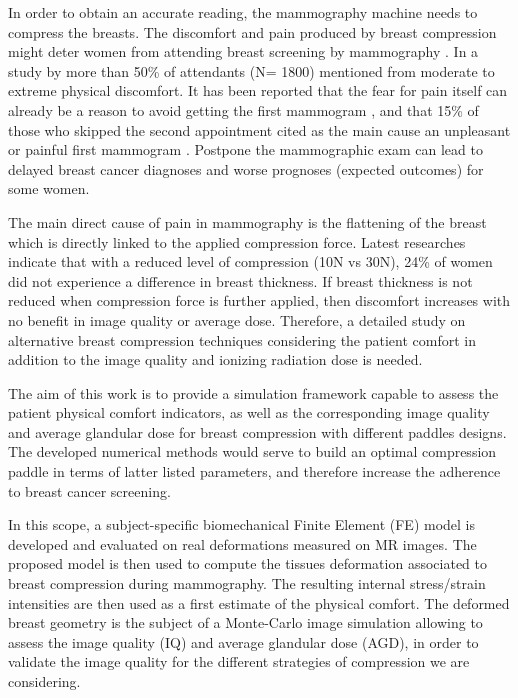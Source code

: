 In order to obtain an accurate reading, the mammography machine needs to compress the breasts.  The discomfort and pain produced by breast compression might deter women from attending breast screening by mammography  \citep{aro_psychosocial_1999,fleming_intermittent_2013}. In a study by \citep{dullum_rates_2000} more than 50\% of attendants (N= 1800) mentioned from moderate to extreme physical discomfort.  It has been reported that the
fear for pain itself can already be a reason to avoid getting the first mammogram \citep{andrews_pain_2001}, and that 15\% of those who skipped the second appointment cited as the main cause an unpleasant or painful first mammogram \citep{fleming_intermittent_2013,whelehan_effect_2013}.  Postpone the mammographic exam can lead to delayed breast cancer diagnoses and worse prognoses (expected outcomes) for some women.

The main direct cause of pain in mammography is the flattening of the breast which is directly linked to the applied compression force. Latest researches indicate that with a reduced level of compression (10N vs 30N), 24\% of women did not experience a difference in breast thickness. If breast thickness is not reduced when compression force is further applied, then discomfort increases with no benefit in image quality or average dose. Therefore, a detailed study on alternative breast compression techniques considering the patient comfort in addition to the image quality and ionizing radiation dose is needed.

The aim of this work is to provide a simulation framework capable to assess the patient physical comfort indicators, as well as the corresponding image quality and average glandular dose for breast compression with different paddles designs. The developed numerical methods would serve to build an optimal compression paddle in terms of latter listed parameters, and therefore increase the adherence to breast cancer screening. 

In this scope, a subject-specific biomechanical Finite Element (FE) model is developed and evaluated on real deformations measured on MR images. The proposed model is then used to compute the tissues deformation associated to breast compression during mammography.  The resulting internal stress/strain intensities are then used as a first estimate of the physical comfort. The deformed breast geometry is the subject of a Monte-Carlo image simulation allowing to assess the image quality (IQ) and average glandular dose (AGD), in order to validate the image quality for the different strategies of compression we are considering.




